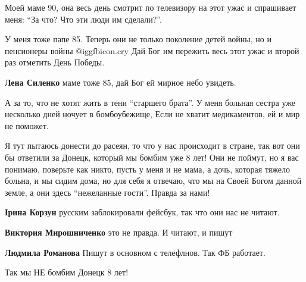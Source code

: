  
 
 
 
 
\zzSecCmt

\begin{itemize} %

Моей маме 90, она весь день смотрит по телевизору на этот ужас и спрашивает
меня: \enquote{За что? Что эти люди им сделали?}.


У меня тоже папе 85. Теперь они не только поколение детей войны, но и
пенсионеры войны  @igg{fbicon.cry}  Дай Бог им пережить весь этот ужас и второй раз отметить
День Победы.


\textbf{Лена Силенко} маме тоже 85, дай Бог ей мирное небо увидеть.


А за то, что не хотят жить в тени \enquote{старшего брата}. У меня больная сестра уже
несколько дней ночует в бомбоубежище, Если не хватит медикаментов, ей и мир не
поможет.


Я тут пытаюсь донести до расеян, то что у нас происходит в стране, так вот они
бы ответили за Донецк, который мы бомбим уже 8 лет!  Они не поймут, но я вас
понимаю, поверьте как никто, пусть у меня и не мама, а дочь, которая тяжело
больна, и мы сидим дома, но для себя я отвечаю, что мы на Своей Богом данной
земле, а они здесь \enquote{нежеланные гости}. Правда за нами!

\begin{itemize} %
\textbf{Ірина Корзун} русским заблокировали фейсбук, так что они нас не читают.

\textbf{Виктория Мирошниченко} это не правда. И читают, и пишут

\textbf{Людмила Романова} Пишут в основном с телефлнов. Так ФБ работает.

Так мы НЕ бомбим Донецк 8 лет!
\end{itemize} %



\end{itemize}
